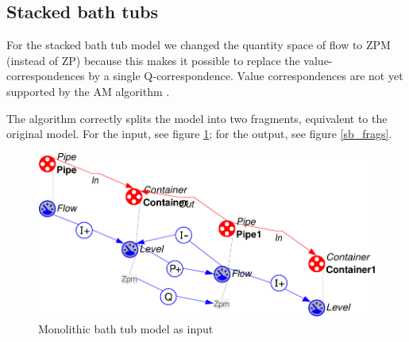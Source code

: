 \documentclass{article} %
\begin{document}
\subsection{Stacked bath tubs}

For the stacked bath tub model we changed the quantity space of flow to ZPM
(instead of ZP) because this makes it possible to replace the
value-correspondences by a single Q-correspondence. Value correspondences are
not yet supported by the AM algorithm \cite{vanweelden}.  

The algorithm correctly splits the model into two fragments, equivalent to the
original model. For the input, see figure \ref{sb_mono}; for the output, see
figure \ref{sb_frags}.

\begin{figure}[ht]
\centering
\includegraphics[scale=0.5]{sb_mono-crop.pdf}
\caption{Monolithic bath tub model as input}
\label{sb_mono}
\end{figure}
\end{document}
